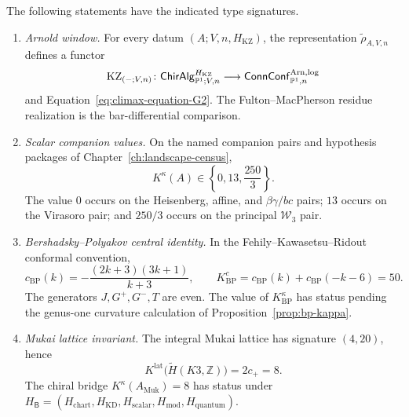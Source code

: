 \begin{theorem}
\label{thm:climax-vol1-platonic}
\ClaimStatusConditional
The following statements have the indicated type signatures.
\begin{enumerate}[label=\textup{(\roman*)}]
\item \emph{Arnold window.}  For every datum
$(A;V,n,H_{\mathrm{KZ}})$, the representation
$\widetilde\rho_{A,V,n}$ defines a functor
\begin{equation}
\label{eq:KZ-functor-signature-platonic}
 \mathrm{KZ}_{(-;V,n)}\colon
 \mathsf{ChirAlg}^{H_{\mathrm{KZ}}}_{\mathbb P^1;V,n}
 \longrightarrow
 \mathsf{ConnConf}^{\mathrm{Arn,log}}_{\mathbb P^1,n}
\end{equation}
and Equation~\eqref{eq:climax-equation-G2}.  The
Fulton--MacPherson residue realization is the bar-differential
comparison.

\item \emph{Scalar companion values.}  On the named companion pairs
and hypothesis packages of Chapter~\ref{ch:landscape-census},
\begin{equation}
\label{eq:climax-scalar-companion-values}
 K^\kappa(A)\in\left\{0,13,\frac{250}{3}\right\}.
\end{equation}
The value $0$ occurs on the Heisenberg, affine, and
$\beta\gamma/bc$ pairs; $13$ occurs on the Virasoro pair; and
$250/3$ occurs on the principal $\mathcal W_3$ pair.

\item \emph{Bershadsky--Polyakov central identity.}  In the
Fehily--Kawasetsu--Ridout conformal convention,
\begin{equation}
\label{eq:climax-bp-central-lane}
c_{\mathrm{BP}}(k)
=-\frac{(2k+3)(3k+1)}{k+3},
\qquad
K^c_{\mathrm{BP}}=c_{\mathrm{BP}}(k)+c_{\mathrm{BP}}(-k-6)=50.
\end{equation}
The generators $J,G^+,G^-,T$ are even.  The value of
$K^\kappa_{\mathrm{BP}}$ has status \ClaimStatusOpen{} pending the
genus-one curvature calculation of
Proposition~\ref{prop:bp-kappa}.

\item \emph{Mukai lattice invariant.}  The integral Mukai lattice has
signature $(4,20)$, hence
\begin{equation}
\label{eq:climax-mukai-lattice-lane}
K^{\mathrm{lat}}\bigl(\widetilde H(K3,\mathbb Z)\bigr)
=2c_+=8.
\end{equation}
The chiral bridge
$K^\kappa(A_{\mathrm{Muk}})=8$ has status
\ClaimStatusConjectured{} under
$H_{\mathsf B}=(H_{\mathrm{chart}},H_{\mathrm{KD}},H_{\mathrm{scalar}},
H_{\mathrm{mod}},H_{\mathrm{quantum}})$.


\end{enumerate}
\end{theorem}
